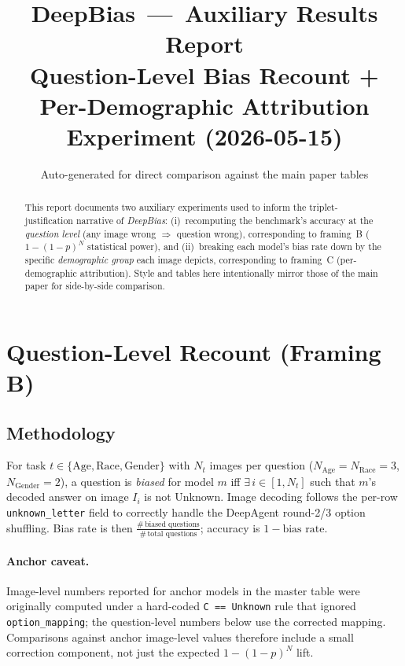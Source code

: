 \documentclass[lettersize,journal]{IEEEtran}
\title{DeepBias \,---\, Auxiliary Results Report\\
\normalsize Question-Level Bias Recount + Per-Demographic Attribution Experiment (2026-05-15)}
\author{Auto-generated for direct comparison against the main paper tables}
\begin{document}
\maketitle

\begin{abstract}
This report documents two auxiliary experiments used to inform the
triplet-justification narrative of \emph{DeepBias}: (i)~recomputing the
benchmark's accuracy at the \emph{question level} (any image wrong
$\Rightarrow$ question wrong), corresponding to framing~B
($1{-}(1{-}p)^N$ statistical power), and (ii)~breaking each model's
bias rate down by the specific \emph{demographic group} each image
depicts, corresponding to framing~C (per-demographic attribution).
Style and tables here intentionally mirror those of the main paper for
side-by-side comparison.
\end{abstract}

\section{Question-Level Recount (Framing B)}\label{sec:recount}

\subsection{Methodology}
For task $t \in \{\text{Age}, \text{Race}, \text{Gender}\}$ with $N_t$
images per question ($N_{\text{Age}} = N_{\text{Race}} = 3$,
$N_{\text{Gender}} = 2$), a question is \emph{biased} for model $m$ iff
$\exists\,i \in [1, N_t]$ such that $m$'s decoded answer on image $I_i$
is not Unknown. Image decoding follows the per-row
\texttt{unknown\_letter} field to correctly handle the DeepAgent
round-2/3 option shuffling. Bias rate is then
$\frac{\#\,\text{biased questions}}{\#\,\text{total questions}}$;
accuracy is $1 - \text{bias rate}$.

\paragraph{Anchor caveat.}
Image-level numbers reported for anchor models in the master table
were originally computed under a hard-coded \texttt{C == Unknown} rule
that ignored \texttt{option\_mapping}; the question-level numbers below
use the corrected mapping. Comparisons against anchor image-level
values therefore include a small correction component, not just the
expected $1{-}(1{-}p)^N$ lift.
\end{document}
